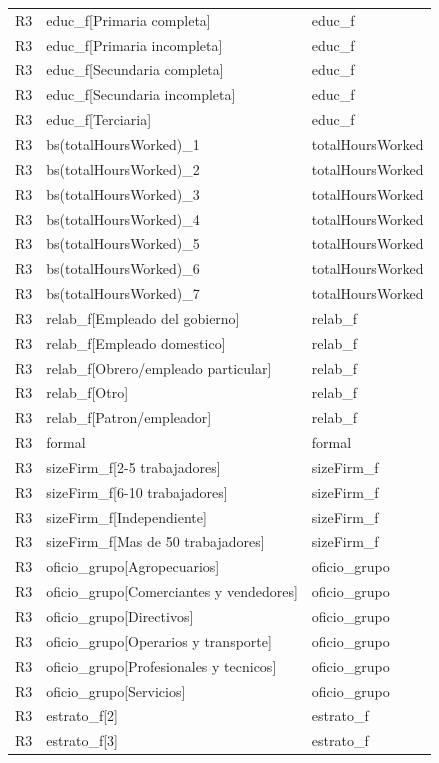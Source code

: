 \begin{longtable}{lll}
R3 & educ\_f[Primaria completa] & educ\_f \\
R3 & educ\_f[Primaria incompleta] & educ\_f \\
R3 & educ\_f[Secundaria completa] & educ\_f \\
R3 & educ\_f[Secundaria incompleta] & educ\_f \\
R3 & educ\_f[Terciaria] & educ\_f \\
R3 & bs(totalHoursWorked)\_1 & totalHoursWorked \\
R3 & bs(totalHoursWorked)\_2 & totalHoursWorked \\
R3 & bs(totalHoursWorked)\_3 & totalHoursWorked \\
R3 & bs(totalHoursWorked)\_4 & totalHoursWorked \\
R3 & bs(totalHoursWorked)\_5 & totalHoursWorked \\
R3 & bs(totalHoursWorked)\_6 & totalHoursWorked \\
R3 & bs(totalHoursWorked)\_7 & totalHoursWorked \\
R3 & relab\_f[Empleado del gobierno] & relab\_f \\
R3 & relab\_f[Empleado domestico] & relab\_f \\
R3 & relab\_f[Obrero/empleado particular] & relab\_f \\
R3 & relab\_f[Otro] & relab\_f \\
R3 & relab\_f[Patron/empleador] & relab\_f \\
R3 & formal & formal \\
R3 & sizeFirm\_f[2-5 trabajadores] & sizeFirm\_f \\
R3 & sizeFirm\_f[6-10 trabajadores] & sizeFirm\_f \\
R3 & sizeFirm\_f[Independiente] & sizeFirm\_f \\
R3 & sizeFirm\_f[Mas de 50 trabajadores] & sizeFirm\_f \\
R3 & oficio\_grupo[Agropecuarios] & oficio\_grupo \\
R3 & oficio\_grupo[Comerciantes y vendedores] & oficio\_grupo \\
R3 & oficio\_grupo[Directivos] & oficio\_grupo \\
R3 & oficio\_grupo[Operarios y transporte] & oficio\_grupo \\
R3 & oficio\_grupo[Profesionales y tecnicos] & oficio\_grupo \\
R3 & oficio\_grupo[Servicios] & oficio\_grupo \\
R3 & estrato\_f[2] & estrato\_f \\
R3 & estrato\_f[3] & estrato\_f \\

\end{longtable}
